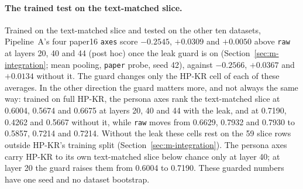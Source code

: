 \paragraph{The trained test on the text-matched slice.}
Trained on the text-matched slice and tested on the other ten datasets, Pipeline~A's four paper16 \texttt{axes} score $-0.2545$, $+0.0309$ and $+0.0050$ above \texttt{raw} at layers 20, 40 and 44 (post hoc) once the leak guard is on (Section~\ref{sec:m-integration}; mean pooling, \texttt{paper} probe, seed 42), against $-0.2566$, $+0.0367$ and $+0.0134$ without it. %
The guard changes only the HP-KR cell of each of these averages. %
In the other direction the guard matters more, and not always the same way: trained on full HP-KR, the persona axes rank the text-matched slice at 0.6004, 0.5674 and 0.6675 at layers 20, 40 and 44 with the leak, and at 0.7190, 0.4262 and 0.5667 without it, while \texttt{raw} moves from 0.6629, 0.7932 and 0.7930 to 0.5857, 0.7214 and 0.7214. %
Without the leak these cells rest on the 59 slice rows outside HP-KR's training split (Section~\ref{sec:m-integration}). %
The persona axes carry HP-KR to its own text-matched slice below chance only at layer 40; at layer 20 the guard raises them from 0.6004 to 0.7190. %
These guarded numbers have one seed and no dataset bootstrap. %

